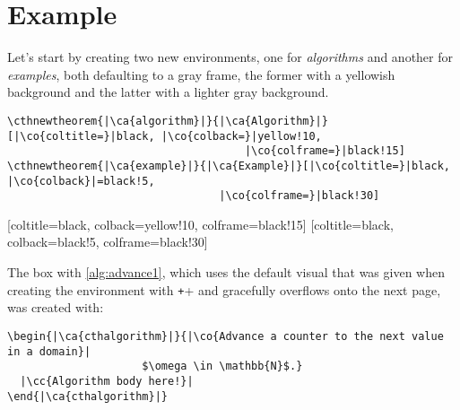 \documentclass{article}
\begin{document}
\section{Example}
\label{sec:examples}

Let's start by creating two new environments, one for \emph{algorithms} and another for \emph{examples}, both defaulting to a gray frame, the former with a yellowish background and the latter with a lighter gray background.

\begin{verbatim}
\cthnewtheorem{|\ca{algorithm}|}{|\ca{Algorithm}|}[|\co{coltitle=}|black, |\co{colback=}|yellow!10,
                                     |\co{colframe=}|black!15]
\cthnewtheorem{|\ca{example}|}{|\ca{Example}|}[|\co{coltitle=}|black, |\co{colback}|=black!5,
                                 |\co{colframe=}|black!30]  
\end{verbatim}

[coltitle=black, colback=yellow!10, colframe=black!15]
[coltitle=black, colback=black!5, colframe=black!30]


The box with \autoref{alg:advance1}, which uses the default visual that was given when creating the environment with \texttt+\cthnewtheorem+ and gracefully overflows onto the next page, was created with:
\begin{verbatim}
\begin{|\ca{cthalgorithm}|}{|\co{Advance a counter to the next value in a domain}|
                     $\omega \in \mathbb{N}$.}
  |\cc{Algorithm body here!}|
\end{|\ca{cthalgorithm}|}
\end{verbatim}

\newcommand{\bracesemptyset}{\ensuremath{\lbrace\,\rbrace}}
\end{document}
